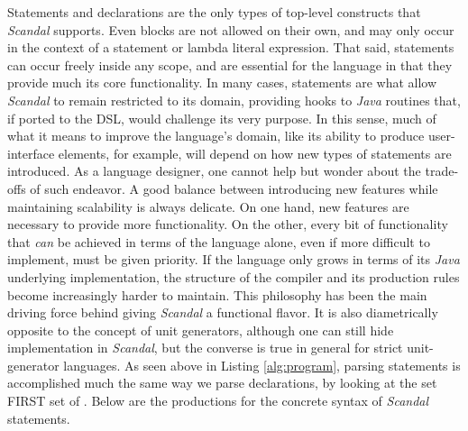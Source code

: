 Statements and declarations are the only types of top-level constructs that \emph{Scandal} supports. Even blocks are not allowed on their own, and may only occur in the context of a statement or lambda literal expression. That said, statements can occur freely inside any scope, and are essential for the language in that they provide much its core functionality. In many cases, statements are what allow \emph{Scandal} to remain restricted to its domain, providing hooks to \emph{Java} routines that, if ported to the DSL, would challenge its very purpose. In this sense, much of what it means to improve the language's domain, like its ability to produce user-interface elements, for example, will depend on how new types of statements are introduced. As a language designer, one cannot help but wonder about the trade-offs of such endeavor. A good balance between introducing new features while maintaining scalability is always delicate. On one hand, new features are necessary to provide more functionality. On the other, every bit of functionality that \emph{can} be achieved in terms of the language alone, even if more difficult to implement, must be given priority. If the language only grows in terms of its \emph{Java} underlying implementation, the structure of the compiler and its production rules become increasingly harder to maintain. This philosophy has been the main driving force behind giving \emph{Scandal} a functional flavor. It is also diametrically opposite to the concept of unit generators, although one can still hide implementation in \emph{Scandal}, but the converse is true in general for strict unit-generator languages. As seen above in Listing \ref{alg:program}, parsing statements is accomplished much the same way we parse declarations, by looking at the set FIRST set of . Below are the productions for the concrete syntax of \emph{Scandal} statements.

